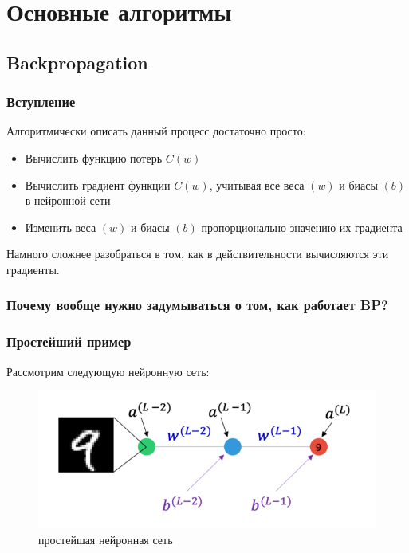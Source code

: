 \documentclass[a4paper, 10pt, openany]{book} %
\begin{document}
	\chapter{Основные алгоритмы}
	
	\section{Backpropagation}
	
	\subsection{Вступление}
	
	Алгоритмически описать данный процесс достаточно просто:
	
	\begin{itemize}
		\item Вычислить функцию потерь $C(w)$
		\item Вычислить градиент функции $C(w)$, учитывая все веса $(w)$ и биасы $(b)$ в нейронной сети
		\item Изменить веса $(w)$ и биасы $(b)$ пропорционально значению их градиента
	\end{itemize}
	
	Намного сложнее разобраться в том, как в действительности вычисляются эти градиенты.
	
	\subsection{Почему вообще нужно задумываться о том, как работает BP?}
	
	\subsection{Простейший пример}
	
	Рассмотрим следующую нейронную сеть:
	
	\begin{figure}[h!]
		\centering
		\includegraphics[width=\linewidth]{pictures/backpropagation/1-1-1_network.png}
		\caption{простейшая нейронная сеть}
		\label{simplest_nn}
	\end{figure}
	
\end{document}
